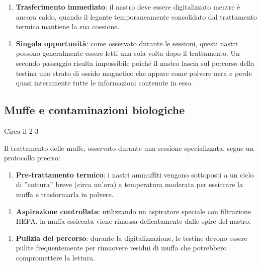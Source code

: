\begin{enumerate}
    \item \textbf{Trasferimento immediato}: il nastro deve essere digitalizzato mentre è ancora caldo, quando il legante temporaneamente consolidato dal trattamento termico mantiene la sua coesione.
\end{enumerate}

\begin{enumerate}
    \item \textbf{Singola opportunità}: come osservato durante le sessioni, questi nastri possono generalmente essere letti una sola volta dopo il trattamento. Un secondo passaggio risulta impossibile poiché il nastro lascia sul percorso della testina uno strato di ossido magnetico che appare come polvere nera e perde quasi interamente tutte le informazioni contenute in esso.
\end{enumerate}
\subsection{Muffe e contaminazioni biologiche}
Circa il 2-3%

Il trattamento delle muffe, osservato durante una sessione specializzata, segue un protocollo preciso:

\begin{enumerate}
    \item \textbf{Pre-trattamento termico}: i nastri ammuffiti vengono sottoposti a un ciclo di ''cottura'' breve (circa un'ora) a temperatura moderata per essiccare la muffa e trasformarla in polvere.
\end{enumerate}

\begin{enumerate}
    \item \textbf{Aspirazione controllata}: utilizzando un aspiratore speciale con filtrazione HEPA, la muffa essiccata viene rimossa delicatamente dalle spire del nastro.
\end{enumerate}

\begin{enumerate}
    \item \textbf{Pulizia del percorso}: durante la digitalizzazione, le testine devono essere pulite frequentemente per rimuovere residui di muffa che potrebbero compromettere la lettura.
\end{enumerate}
